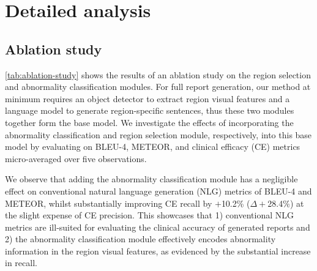 \documentclass[10pt,twocolumn,letterpaper]{article}
\begin{document}
\section{Detailed analysis}
\subsection{Ablation study}\label{appendix:ablation_study}

\cref{tab:ablation-study} shows the results of an ablation study on the region selection and abnormality classification modules. For full report generation, our method at minimum requires an object detector to extract region visual features and a language model to generate region-specific sentences, thus these two modules together form the base model. We investigate the effects of incorporating the abnormality classification and region selection module, respectively, into this base model by evaluating on BLEU-4, METEOR, and clinical efficacy (CE) metrics micro-averaged over five observations.

We observe that adding the abnormality classification module has a negligible effect on conventional natural language generation (NLG) metrics of BLEU-4 and METEOR, whilst substantially improving CE recall by $+$10.2\% ($\Delta+$28.4\%) at the slight expense of CE precision. This showcases that 1) conventional NLG metrics are ill-suited for evaluating the clinical accuracy of generated reports \cite{boag2020baselines, liu2019clinically, pino2020inspecting} and 2) the abnormality classification module effectively encodes abnormality information in the region visual features, as evidenced by the substantial increase in recall.
\end{document}
